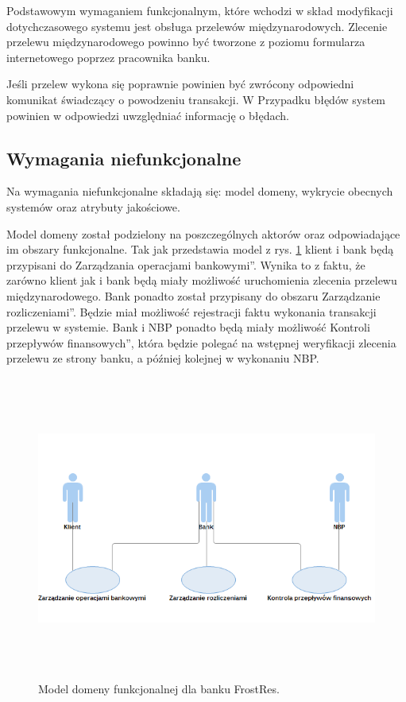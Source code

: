 Podstawowym wymaganiem funkcjonalnym, które wchodzi w skład modyfikacji dotychczasowego systemu jest obsługa przelewów międzynarodowych. Zlecenie przelewu międzynarodowego powinno być tworzone z poziomu formularza internetowego poprzez pracownika banku.

Jeśli przelew wykona się poprawnie powinien być zwrócony odpowiedni komunikat świadczący o powodzeniu transakcji. W Przypadku błędów system powinien w odpowiedzi uwzględniać informację o błędach.

\subsection*{Wymagania niefunkcjonalne}
Na wymagania niefunkcjonalne składają się: model domeny, wykrycie obecnych systemów oraz atrybuty jakościowe.

Model domeny został podzielony na poszczególnych aktorów oraz odpowiadające im obszary funkcjonalne. Tak jak przedstawia model z rys. \ref{model_domeny_funk} klient i bank będą przypisani do \quotedblbase Zarządzania operacjami bankowymi\textquotedblright. Wynika to z faktu, że zarówno klient jak i bank będą miały możliwość uruchomienia zlecenia przelewu międzynarodowego. Bank ponadto został przypisany do obszaru \quotedblbase Zarządzanie rozliczeniami\textquotedblright. Będzie miał możliwość rejestracji faktu wykonania transakcji przelewu w systemie. Bank i NBP ponadto będą miały możliwość \quotedblbase Kontroli przepływów finansowych\textquotedblright, która będzie polegać na wstępnej weryfikacji zlecenia przelewu ze strony banku, a później kolejnej w wykonaniu NBP.

\begin{figure}[h!tbp]
\begin{centering}
\includegraphics[width=13cm, height=10cm]{img/model_domeny_funk.png}
\caption[Model domeny funkcjonalnej dla banku FrostRes]{Model domeny funkcjonalnej dla banku FrostRes.}\label{model_domeny_funk}
\end{centering}
\end{figure}

